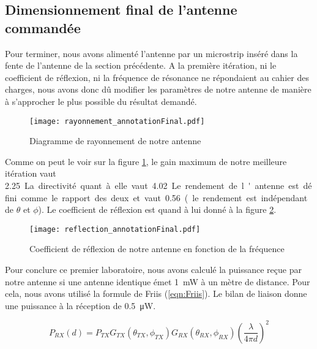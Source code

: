 \subsection{Dimensionnement final de l'antenne commandée}
Pour terminer, nous avons alimenté l'antenne par un microstrip inséré dans la fente de l'antenne de la section précédente. A la première itération, ni le coefficient de réflexion, ni la fréquence de résonance ne répondaient au cahier des charges, nous avons donc dû modifier les paramètres de notre antenne de manière à s'approcher le plus possible du résultat demandé.
\begin{figure}[htbp]
\centering
\texttt{[image: rayonnement\_annotationFinal.pdf]}
\caption{Diagramme de rayonnement de notre antenne}
\label{fig:rayonnement_annotationFinal}
\end{figure}
Comme on peut le voir sur la figure \ref{fig:rayonnement_annotationFinal}, le gain maximum de notre meilleure itération vaut \SI{2.25}. La directivité quant à elle vaut \SI{4.02}. Le rendement de l'antenne est défini comme le rapport des deux et vaut \SI{0.56} (le rendement est indépendant de $\theta$ et $\phi$). Le coefficient de réflexion est quand à lui donné à la figure \ref{fig:reflection_annotationFinal}.
\begin{figure}[htbp]
\centering
\texttt{[image: reflection\_annotationFinal.pdf]}
\caption{Coefficient de réflexion de notre antenne en fonction de la fréquence}
\label{fig:reflection_annotationFinal}
\end{figure}

Pour conclure ce premier laboratoire, nous avons calculé la puissance reçue par notre antenne si une antenne identique émet \SI{1}{\milli\watt} à un mètre de distance. Pour cela, nous avons utilisé la formule de Friis (\ref{eqn:Friis}). Le bilan de liaison donne une puissance à la réception de \SI{0.5}{\micro\watt}.

\begin{equation}
P_{RX}(d) = P_{TX}G_{TX}(\theta_{TX},\phi_{TX})G_{RX}(\theta_{RX},\phi_{RX})\left(\frac{\lambda}{4\pi d}\right)^2
\label{eqn:Friis}
\end{equation}


